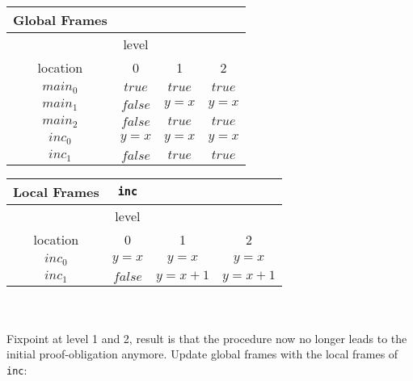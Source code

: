 \documentclass{article}
\begin{document}
\begin{minipage}{.4\textwidth}
	\setlength\tabcolsep{0.35em}
	\begin{center}
		\begin{tabu}{cccc}
			Global Frames \\
			\toprule
			& level \\
			\cmidrule(lr){2-4}
			location & 0 & 1 & 2 \\
			$main_0$ & $true$ & $true$ & $true$  \\
			$main_1$ & $false$ & $y = x$ & $y = x$\\
			$main_2$ & $false$ & $true$ & $true$ \\
			$inc_0$ & $y = x$ & $y = x$ & $y = x$ \\
			$inc_1$ & $false$ & $true$ & $true$\\
			\bottomrule
		\end{tabu}
	\end{center}
\end{minipage}
\hfill
\begin{minipage}{.5\textwidth}
	\setlength\tabcolsep{0.35em}
	\begin{center}
		\begin{tabu}{cccc}
			Local Frames & \texttt{inc}\\
			\toprule
			& level \\
			\cmidrule(lr){2-4}
			location & 0 & 1 & 2\\
			$inc_0$ & $y = x$ & $y = x$ & $y = x$  \\
			$inc_1$ & $false$ & $y = x + 1$  & $y = x + 1$\\
			\bottomrule
		\end{tabu}
	\end{center}	
\end{minipage} \\ \\

Fixpoint at level 1 and 2, result is that the procedure now no longer leads to the initial proof-obligation anymore. Update global frames with the local frames of \texttt{inc}: \\ \\
\end{document}
